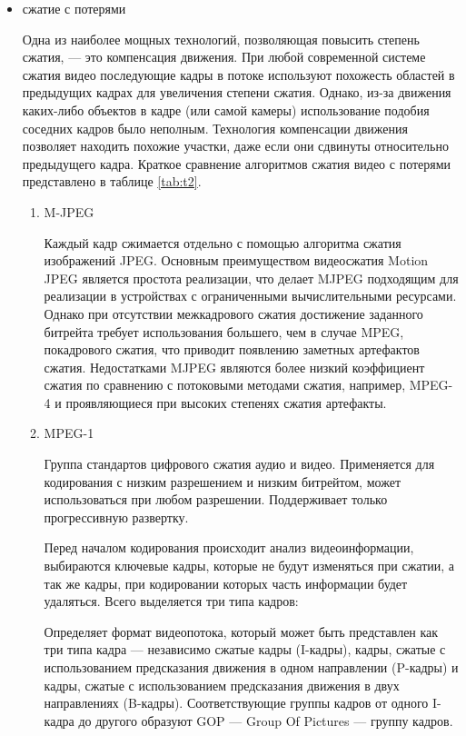 \begin{itemize}
\item сжатие с потерями

Одна из наиболее мощных технологий, позволяющая повысить степень сжатия, — это компенсация движения. 
При любой современной системе сжатия видео последующие кадры в потоке используют похожесть областей в 
предыдущих кадрах для увеличения степени сжатия. Однако, из-за движения каких-либо 
объектов в кадре (или самой камеры) использование подобия соседних кадров было неполным. 
Технология компенсации движения позволяет находить похожие участки, даже если они сдвинуты 
относительно предыдущего кадра. Краткое сравнение алгоритмов сжатия видео с потерями представлено в таблице \ref{tab:t2}.

\begin{enumerate}
\item M-JPEG 

Каждый кадр сжимается отдельно с помощью алгоритма сжатия изображений JPEG. 
Основным преимуществом видеосжатия Motion JPEG является простота реализации, что делает 
MJPEG подходящим для реализации в устройствах с ограниченными вычислительными ресурсами. 
Однако при отсутствии межкадрового сжатия достижение заданного битрейта требует использования 
большего, чем в случае MPEG, покадрового сжатия, что приводит появлению заметных артефактов 
сжатия. Недостатками MJPEG являются более низкий коэффициент сжатия по сравнению 
с потоковыми методами сжатия, например, MPEG-4 и проявляющиеся при высоких степенях сжатия артефакты.

\item MPEG-1

Группа стандартов цифрового сжатия аудио и видео. 
Применяется для кодирования с низким разрешением и низким битрейтом, может использоваться при любом разрешении. 
Поддерживает только прогрессивную развертку. 

Перед началом кодирования происходит анализ видеоинформации, выбираются ключевые кадры, 
которые не будут изменяться при сжатии, а так же кадры, при кодировании которых часть информации 
будет удаляться. Всего выделяется три типа кадров:

Определяет формат видеопотока, который может быть представлен как три типа кадра — независимо 
сжатые кадры (I-кадры), кадры, сжатые с использованием предсказания движения в одном 
направлении (P-кадры) и кадры, сжатые с использованием предсказания движения в двух направлениях 
(B-кадры). Соответствующие группы кадров от одного I-кадра до другого образуют GOP — Group Of 
Pictures — группу кадров.


\end{enumerate}
\end{itemize}
